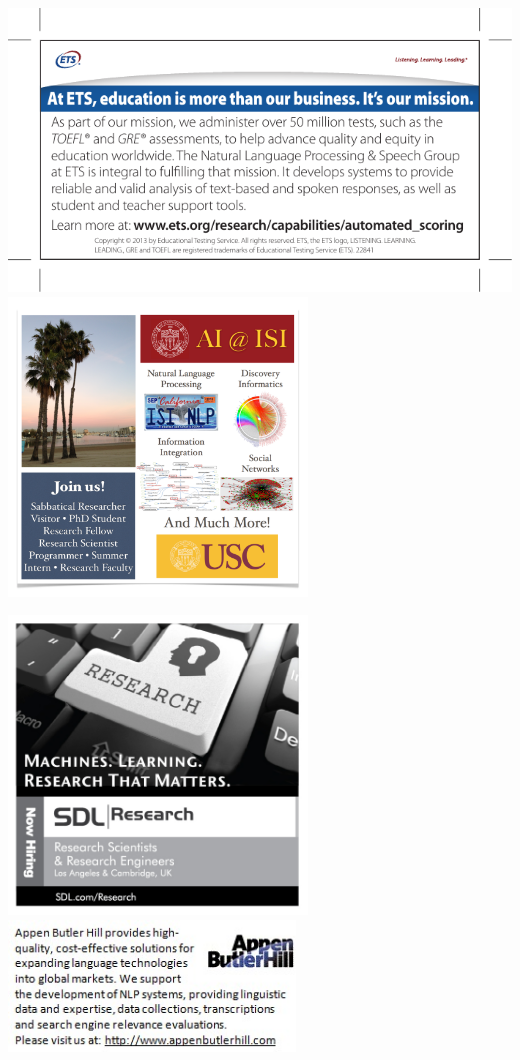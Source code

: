 \documentclass[twoside,makeidx]{book}
\begin{document}
\cleardoublepage
{}
\begin{center}
  \includegraphics{content/ads/ETS.pdf}
  \vfill
  \includegraphics[height=300px]{content/ads/ISI.pdf}
\end{center}
\newpage
\begin{center}
  \includegraphics[height=300px]{content/ads/SDL.pdf}
  \vfill
  \includegraphics[width=3in]{content/ads/AppenButlerHill-gif.jpg}
\end{center}

\cleardoublepage



\end{document}
